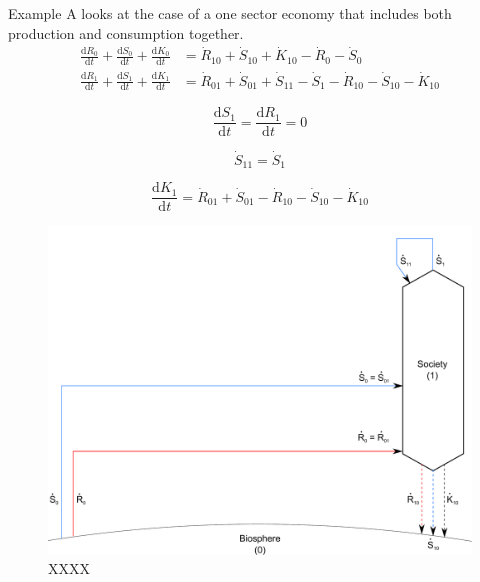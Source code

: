 Example A looks at the case of a one sector economy that includes both production and consumption together. 
\begin{align}
	\frac{\mathrm{d}R_0}{\mathrm{d}t}		
	+	\frac{\mathrm{d}S_0}{\mathrm{d}t}
	+	\frac{\mathrm{d}K_0}{\mathrm{d}t}		&	
	=	\dot{R}_{10}		
	+	\dot{S}_{10}	
	+	\dot{K}_{10}											
	-	\dot{R}_{0}											
	-	\dot{S}_{0}								\\
	\frac{\mathrm{d}R_{1}}{\mathrm{d}t}
	+ \frac{\mathrm{d}S_{1}}{\mathrm{d}t}
	+ \frac{\mathrm{d}K_{1}}{\mathrm{d}t}		&
	= \dot{R}_{01} 
	+ \dot{S}_{01} + \dot{S}_{11}
	- \dot{S}_{1}				
	- \dot{R}_{10}				
	- \dot{S}_{10}				
	- \dot{K}_{10}											
\end{align}



\begin{equation}\label{eq:A-dS_1/dt_zero}
	\frac{\mathrm{d}S_1}{\mathrm{d}t} = 
	\frac{\mathrm{d}R_1}{\mathrm{d}t} = 0
\end{equation}

\begin{equation}\label{eq:A1_self_cons}
	\dot{S}_{11} = \dot{S}_{1}
\end{equation}

\begin{equation}\label{eq:single_sector_material_steady_state}
	\frac{\mathrm{d}K_{1}}{\mathrm{d}t}
	= \dot{R}_{01} 
	+ \dot{S}_{01} 
	- \dot{R}_{10} - \dot{S}_{10} - \dot{K}_{10}
\end{equation}

\begin{figure}[h!]
\centering
\includegraphics[width=0.8\linewidth]{Part_1/Chapter_Materials/images/1_sector_materials.pdf}
\caption{XXXX}
\label{fig:A_materials}
\end{figure}

